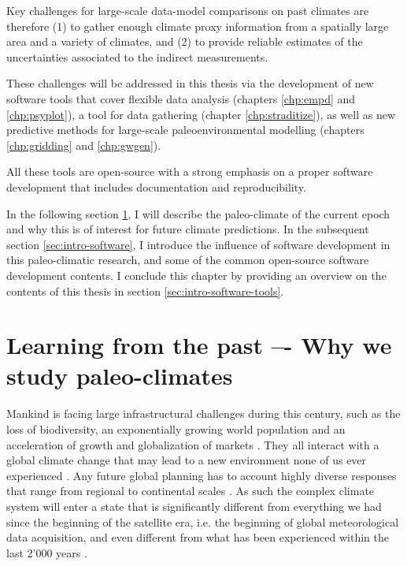 \begin{refsection}
Key challenges for large-scale data-model comparisons on past climates are therefore (1) to gather enough climate proxy information from a spatially large area and a variety of climates, and (2) to provide reliable estimates of the uncertainties associated to the indirect measurements.

These challenges will be addressed in this thesis via the development of new software tools that cover flexible data analysis (chapters \ref{chp:empd} and \ref{chp:psyplot}), a tool for data gathering (chapter \ref{chp:straditize}), as well as new predictive methods for large-scale paleoenvironmental modelling (chapters \ref{chp:gridding} and \ref{chp:gwgen}).

All these tools are open-source with a strong emphasis on a proper software development that includes documentation and reproducibility. 

In the following section \ref{sec:intro-paleo}, I will describe the paleo-climate of the current epoch and why this is of interest for future climate predictions. In the subsequent section \ref{sec:intro-software}, I introduce the influence of software development in this paleo-climatic research, and some of the common open-source software development contents. I conclude this chapter by providing an overview on the contents of this thesis in section \ref{sec:intro-software-tools}.

\section{Learning from the past –- Why we study paleo-climates} \label{sec:intro-paleo}

Mankind is facing large infrastructural challenges during this century, such as the loss of biodiversity, an exponentially growing world population and an acceleration of growth and globalization of markets \citep[e.g.][]{CeballosEhrlichBarnoskyEtAl2015, UniNations2019, WorldBank2002}. They all interact with a global climate change that may lead to a new environment none of us ever experienced \citep{CollinsKnuttiArblasterEtAl2013}. Any future global planning has to account highly diverse responses that range from regional to continental scales \citep{ChristensenKrishnaKumarAldrianEtAl2013}. As such the complex climate system will enter a state that is significantly different from everything we had since the beginning of the satellite era, i.e. the beginning of global meteorological data acquisition, and even different from what has been experienced within the last 2'000 years \citep{NeukomSteigerGomezNavarroEtAl2019, NeukomBarbozaErbEtAl2019}.


\end{refsection}
